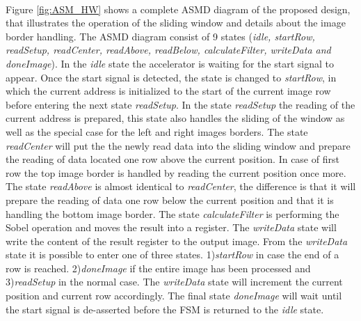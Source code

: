 \paragraph*{}
Figure \ref{fig:ASM_HW} shows a complete ASMD diagram of the proposed design, that illustrates the operation of the sliding window and details about the image border handling. The ASMD diagram consist of 9 states (\emph{idle, startRow, readSetup, readCenter, readAbove, readBelow, calculateFilter, writeData and doneImage}).
In the \emph{idle} state the accelerator is waiting for the start signal to appear. Once the start signal is detected, the state is changed to \emph{startRow}, in which the current address is initialized to the start of the current image row before entering the next state \emph{readSetup}. In the state \emph{readSetup} the reading of the current address is prepared, this state also handles the sliding of the window as well as the special case for the left and right images borders. 
The state \emph{readCenter} will put the the newly read data into the sliding window and prepare the reading of data located one row above the current position. In case of first row the top image border is handled by reading the current position once more. The state \emph{readAbove} is almost identical to \emph{readCenter}, the difference is that it will prepare the reading of data one row below the current position and that it is handling the bottom image border.
The state \emph{calculateFilter} is performing the Sobel operation and moves the result into a register. The \emph{writeData} state will write the content of the result register to the output image. From the \emph{writeData} state it is possible to enter one of three states. 1)\emph{startRow} in case the end of a row is reached. 2)\emph{doneImage} if the entire image has been processed and 3)\emph{readSetup} in the normal case.
The \emph{writeData} state will increment the current position and current row accordingly. The final state \emph{doneImage} will wait until the start signal is de-asserted before the FSM is returned to the \emph{idle} state.


